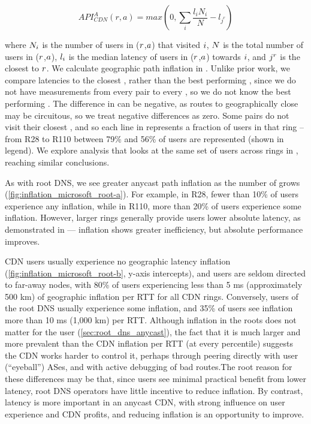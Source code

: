 \documentclass[sigconf,letterpaper,nonacm,10pt,anonymous]{acmart}
\begin{document}
\begin{equation}
\label{eq:cdn_api_calc}
API^A_{CDN}(r,a) = max(0, \sum_{i} \frac{l_i N_i}{N} - l_{{j^r}})
\end{equation}

where \(\mathnormal{N_i}\) is the number of users in
(\(\mathnormal{r}\),\(\mathnormal{a}\)) that visited
\fe \(\mathnormal{i}\), \(\mathnormal{N}\) is the total number of users
in (\(\mathnormal{r}\),\(\mathnormal{a}\)), \(\mathnormal{l_i}\) is the
median latency of users in (\(\mathnormal{r}\),\(\mathnormal{a}\))
towards \fe \(\mathnormal{i}\), and \fe \(\mathnormal{j^r}\) is the
closest \fe to \(\mathnormal{r}\). We calculate geographic path
inflation in . Unlike prior work, we
compare latencies to the closest \fe, rather than the best performing
\fe \cite{calder2015analyzing,li_levin_spring_bhattacharjee_2018}, since
we do not have measurements from every \metroas pair to every \fe, so we
do not know the best performing \fe. The difference in
 can be negative, as routes to geographically
close \feplural may be circuitous, so we treat negative differences as
zero. Some \metroas pairs do
not visit their closest \fe, and so each line in
 represents a fraction of users in
that ring -- from R28 to R110 between 79\% and 56\% of users are
represented (shown in legend). We explore analysis that looks at the
same set of users across rings in
, reaching similar
conclusions.

As with root DNS, we see greater anycast path inflation as the number of
\feplural grows (\cref{fig:inflation_microsoft_root-a}). For example, in
R28, fewer than 10\% of users experience any inflation, while in R110,
more than 20\% of users experience some inflation. However, larger rings
generally provide users lower absolute latency, as demonstrated in
 --- inflation shows greater
inefficiency, but absolute performance improves.

CDN users usually experience no geographic latency inflation
(\cref{fig:inflation_microsoft_root-b}, y-axis intercepts), and users
are seldom directed to far-away nodes, with 80\% of users experiencing
less than 5 ms (approximately 500 km) of geographic inflation per RTT
for all CDN rings. Conversely, users of the root DNS usually experience
some inflation, and 35\% of users see inflation more than 10 ms (1,000
km) per RTT. Although inflation in the roots does not matter for the
user (\cref{sec:root_dns_anycast}), the fact that it is much larger and
more prevalent than the CDN inflation per RTT (at every percentile)
suggests the CDN works harder to control it, perhaps through peering
directly with user (``eyeball'') ASes, and with active debugging of bad
routes.The root reason for these differences may be that, since users
see minimal practical benefit from lower latency, root DNS operators
have little incentive to reduce inflation. By contrast, latency is more
important in an anycast CDN, with strong influence on user experience
and CDN profits, and reducing inflation is an opportunity to improve.
\end{document}
